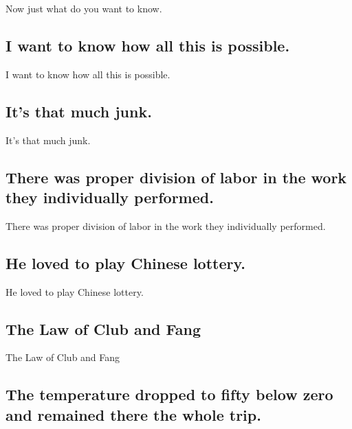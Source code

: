 \documentclass[]{article}
\begin{document}
Now just what do you want to know.

\hypertarget{i-want-to-know-how-all-this-is-possible.}{%
\subsection{I want to know how all this is
possible.}\label{i-want-to-know-how-all-this-is-possible.}}

I want to know how all this is possible.

\hypertarget{its-that-much-junk.}{%
\subsection{It's that much junk.}\label{its-that-much-junk.}}

It's that much junk.

\hypertarget{there-was-proper-division-of-labor-in-the-work-they-individually-performed.}{%
\subsection{There was proper division of labor in the work they
individually
performed.}\label{there-was-proper-division-of-labor-in-the-work-they-individually-performed.}}

There was proper division of labor in the work they individually
performed.

\hypertarget{he-loved-to-play-chinese-lottery.}{%
\subsection{He loved to play Chinese
lottery.}\label{he-loved-to-play-chinese-lottery.}}

He loved to play Chinese lottery.

\hypertarget{the-law-of-club-and-fang}{%
\subsection{The Law of Club and Fang}\label{the-law-of-club-and-fang}}

The Law of Club and Fang

\hypertarget{the-temperature-dropped-to-fifty-below-zero-and-remained-there-the-whole-trip.}{%
\subsection{The temperature dropped to fifty below zero and remained
there the whole
trip.}\label{the-temperature-dropped-to-fifty-below-zero-and-remained-there-the-whole-trip.}}
\end{document}
